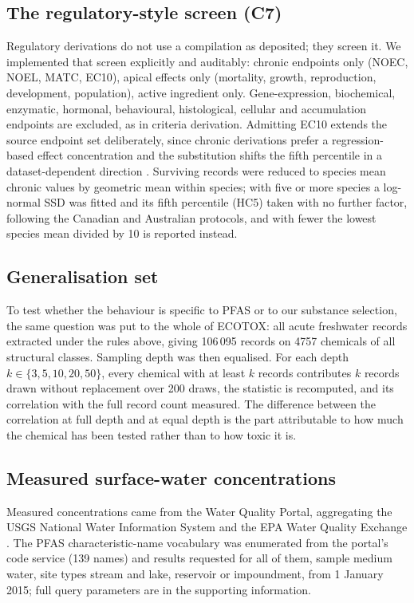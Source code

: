 \documentclass[preprint,12pt]{elsarticle}
\begin{document}
\subsection{The regulatory-style screen (C7)}

Regulatory derivations do not use a compilation as deposited; they screen it. We
implemented that screen explicitly and auditably: chronic endpoints only
(\textsf{NOEC}, \textsf{NOEL}, \textsf{MATC}, \textsf{EC10}), apical effects
only (mortality, growth, reproduction, development, population), active
ingredient only. Gene-expression, biochemical, enzymatic, hormonal,
behavioural, histological, cellular and accumulation endpoints are excluded, as
in criteria derivation. Admitting \textsf{EC10} extends the source endpoint set
deliberately, since chronic derivations prefer a regression-based effect
concentration and the substitution shifts the fifth percentile in a
dataset-dependent direction \cite{iwasaki2015noecec10}. Surviving records were
reduced to species mean chronic values by geometric mean within species; with
five or more species a log-normal SSD was fitted and its fifth percentile (HC5)
taken with no further factor, following the Canadian and Australian protocols,
and with fewer the lowest species mean divided by 10 is reported instead.

\subsection{Generalisation set}

To test whether the behaviour is specific to PFAS or to our substance selection,
the same question was put to the whole of ECOTOX: all acute freshwater records
extracted under the rules above, giving 106\,095 records on 4757 chemicals of
all structural classes. Sampling depth was then equalised. For each depth
$k \in \{3,5,10,20,50\}$, every chemical with at least $k$ records contributes
$k$ records drawn without replacement over 200 draws, the statistic is
recomputed, and its correlation with the full record count measured. The
difference between the correlation at full depth and at equal depth is the part
attributable to how much the chemical has been tested rather than to how toxic
it is.

\subsection{Measured surface-water concentrations}

Measured concentrations came from the Water Quality Portal, aggregating the
USGS National Water Information System and the EPA Water Quality Exchange
\cite{wqp2026}. The PFAS characteristic-name vocabulary was enumerated from
the portal's code service (139 names) and results requested for all of them,
sample medium water, site types stream and lake, reservoir or impoundment,
from 1 January 2015; full query parameters are in the supporting information.
\end{document}
